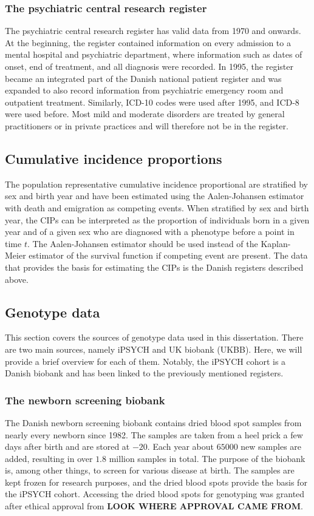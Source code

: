 \subsubsection{The psychiatric central research register}
The psychiatric central research register has valid data from 1970 and onwards. At the beginning, the register contained information on every admission to a mental hospital and psychiatric department, where information such as dates of onset, end of treatment, and all diagnosis were recorded. In 1995, the register became an integrated part of the Danish national patient register and was expanded to also record information from psychiatric emergency room and outpatient treatment. Similarly, ICD-10 codes were used after 1995, and ICD-8 were used before. Most mild and moderate disorders are treated by general practitioners or in private practices and will therefore not be in the register.\cite{mors2011danish}


\subsection{Cumulative incidence proportions}
The population representative cumulative incidence proportional are stratified by sex and birth year and have been estimated using the Aalen-Johansen estimator\cite{hansen2017estimating} with death and emigration as competing events. When stratified by sex and birth year, the CIPs can be interpreted as the proportion of individuals born in a given year and of a given sex who are diagnosed with a phenotype before a point in time $ t $. The Aalen-Johansen estimator should be used instead of the Kaplan-Meier estimator of the survival function if competing event are present. The data that provides the basis for estimating the CIPs is the Danish registers described above.




\subsection{Genotype data}
This section covers the sources of genotype data used in this dissertation. There are two main sources, namely iPSYCH and UK biobank (UKBB). Here, we will provide a brief overview for each of them. Notably, the iPSYCH cohort is a Danish biobank and has been linked to the previously mentioned registers. 

\subsubsection{The newborn screening biobank}
The Danish newborn screening biobank contains dried blood spot samples from nearly every newborn since 1982. The samples are taken from a heel prick a few days after birth and are stored at $ -20 $\textcelsius. Each year about $ 65000 $ new samples are added, resulting in over $ 1.8 $ million samples in total. The purpose of the biobank is, among other things, to screen for various disease at birth. The samples are kept frozen for research purposes, and the dried blood spots provide the basis for the iPSYCH cohort. Accessing the dried blood spots for genotyping was granted after ethical approval from \textbf{LOOK WHERE APPROVAL CAME FROM}. \cite{norgaard2007storage}

